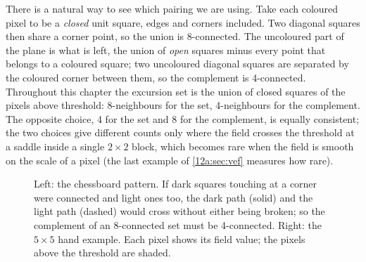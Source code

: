 There is a natural way to see which pairing we are using. Take each coloured pixel to be a \emph{closed}
unit square, edges and corners included. Two diagonal squares then share a corner point, so the union is
8-connected. The uncoloured part of the plane is what is left, the union of \emph{open} squares minus every
point that belongs to a coloured square; two uncoloured diagonal squares are separated by the coloured
corner between them, so the complement is 4-connected. Throughout this chapter the excursion set is the
union of closed squares of the pixels above threshold: 8-neighbours for the set, 4-neighbours for the
complement. The opposite choice, 4 for the set and 8 for the complement, is equally consistent; the two
choices give different counts only where the field crosses the threshold at a saddle inside a single
$2\times2$ block, which becomes rare when the field is smooth on the scale of a pixel (the last example of \cref{12a:sec:vef} measures how rare).

\begin{figure}[htbp]
\centering
{}
\caption{Left: the chessboard pattern. If dark squares touching at a corner were connected and light ones
too, the dark path (solid) and the light path (dashed) would cross without either being broken; so the
complement of an 8-connected set must be 4-connected. Right: the $5\times5$ hand example. Each pixel shows its
field value; the pixels above the threshold are shaded.}
\label{12a:fig:pixels}
\end{figure}

